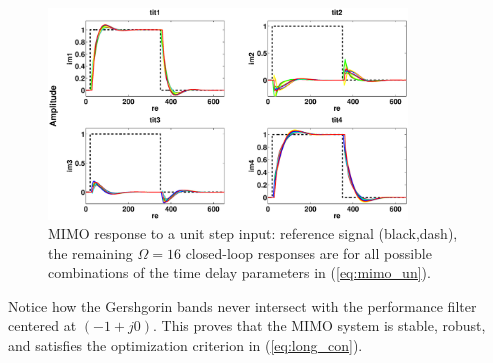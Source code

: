 \documentclass[A4, 10pt, conference]{ieeeconf}
\begin{document}
\begin{figure}
\centering
{}
\centerline{\includegraphics[width=0.85\textwidth]{pics/test.eps}}
\caption{MIMO response to a unit step input: reference signal (black,dash), the remaining $\Omega=16$ closed-loop responses are for all possible combinations of the time delay parameters in (\ref{eq:mimo_un}).}
\label{fig:mimo1}
\end{figure}
Notice how the Gershgorin bands never intersect with the performance filter centered at $(-1+j0)$. This proves that the MIMO system is stable, robust, and satisfies the optimization criterion in (\ref{eq:long_con}).
\end{document}

